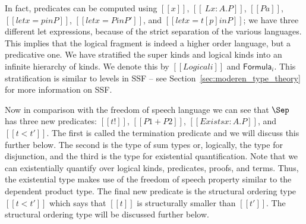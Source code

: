 In fact, predicates can be computed using $[[x]]$, $[[\ L x : A
. P]]$, $[[P a]]$, $[[let x = p in P]]$, $[[let x = P in P']]$, and
$[[let x = t [ p ] in P]]$; we have three different let expressions,
because of the strict separation of the various languages.  This
implies that the logical fragment is indeed a higher order language,
but a predicative one.  We have stratified the super kinds and logical
kinds into an infinite hierarchy of kinds.  We denote this by
$[[Logical i]]$ and $\mathsf{Formula}_{i}$.  This stratification is similar
to levels in SSF -- see
Section~\ref{sec:moderen_type_theory} for more information on SSF.  

Now in comparison with the freedom of speech language we can see that
$\Sep$ has three new predicates: $[[t !]]$, $[[P1 + P2]]$, $[[Exists x
: A . P]]$, and $[[t < t']]$.  The first is called the termination
predicate and we will discuss this further below.  The second is the
type of sum types or, logically, the type for disjunction, and the third
is the type for existential quantification.  Note that we can
existentially quantify over logical kinds, predicates, proofs, and
terms.  Thus, the existential type makes use of the freedom of speech
property similar to the dependent product type.  The final new
predicate is the structural ordering type $[[t < t']]$ which says that
$[[t]]$ is structurally smaller than $[[t']]$.  The structural
ordering type will be discussed further below.

